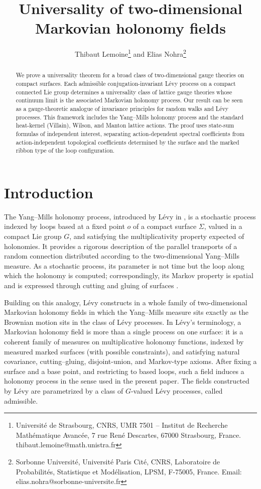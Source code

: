 \documentclass[11pt,a4paper,reqno]{article}
\title{Universality of two-dimensional Markovian holonomy fields}
\author{Thibaut Lemoine\thanks{Universit\'e de Strasbourg, CNRS, UMR 7501 -- Institut de Recherche Math\'ematique Avanc\'ee, 7 rue Ren\'e Descartes, 67000 Strasbourg, France. thibaut.lemoine@math.unistra.fr} \hspace{0.1cm}and Elias Nohra\thanks{Sorbonne Universit\'e, Universit\'e Paris Cit\'e, CNRS, Laboratoire de Probabilit\'es, Statistique et Mod\'elisation, LPSM, F-75005, France. Email: elias.nohra@sorbonne-universite.fr}}
\theoremstyle{definition}
\theoremstyle{remark}
\begin{document}
\maketitle




\begin{abstract}
We prove a universality theorem for a broad class of two-dimensional gauge theories on compact surfaces. Each admissible conjugation-invariant L\'evy process on a compact connected Lie group determines a universality class of lattice gauge theories whose continuum limit is the associated Markovian holonomy process. Our result can be seen as a gauge-theoretic analogue of invariance principles for random walks and L\'evy processes.
This framework includes the Yang--Mills holonomy process and the standard heat-kernel (Villain), Wilson, and Manton lattice actions. The proof uses state-sum formulas of independent interest, separating action-dependent spectral coefficients from action-independent topological coefficients determined by the surface and the marked ribbon type of the loop configuration.
\end{abstract}
\tableofcontents

\section{Introduction}
The Yang--Mills holonomy process, introduced by L\'evy in \cite{Lev03,Lev10}, is a stochastic process indexed by loops based at a fixed point $o$ of a compact surface $\Sigma$, valued in a compact Lie group $G$, and satisfying the multiplicativity property expected of holonomies. It provides a rigorous description of the parallel transports of a random connection distributed according to the two-dimensional Yang--Mills measure. As a stochastic process, its parameter is not time but the loop along which the holonomy is computed; correspondingly, its Markov property is spatial and is expressed through cutting and gluing of surfaces \cite[Chapter 5]{Lev03}. 

Building on this analogy, L\'evy constructs in \cite{Lev10} a whole family of two-dimensional Markovian holonomy fields in which the Yang--Mills measure sits exactly as the Brownian motion sits in the class of Lévy processes. In L\'evy's terminology, a Markovian holonomy field is more than a single process on one surface: it is a coherent family of measures on multiplicative holonomy functions, indexed by measured marked surfaces (with possible constraints), and satisfying natural covariance, cutting--gluing, disjoint-union, and Markov-type axioms. After fixing a surface and a base point, and restricting to based loops, such a field induces a holonomy process in the sense used in the present paper. The fields constructed by L\'evy are parametrized by a class of $G$-valued L\'evy processes, called admissible.
\end{document}
